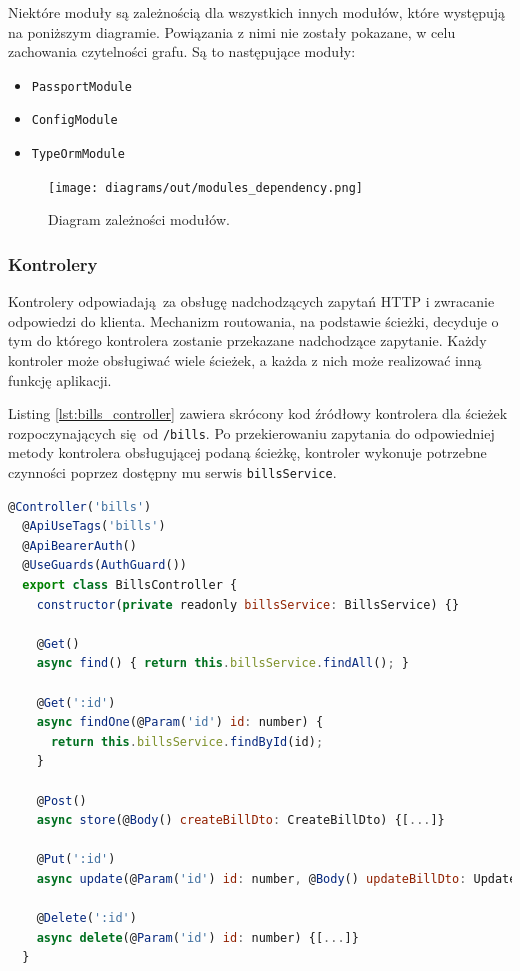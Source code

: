 Niektóre moduły są zależnością dla wszystkich innych modułów, które występują na poniższym diagramie. Powiązania z nimi nie zostały pokazane, w celu zachowania czytelności grafu. Są to następujące moduły:
\begin{itemize}[noitemsep]
  \item \lstinline{PassportModule}
  \item \lstinline{ConfigModule}
  \item \lstinline{TypeOrmModule}
\end{itemize}


\begin{figure}[H]
  \centering
  \texttt{[image: diagrams/out/modules\_dependency.png]}
  \caption{Diagram zależności modułów.}
\end{figure}


\subsubsection{Kontrolery}
Kontrolery odpowiadają za obsługę nadchodzących zapytań HTTP i zwracanie odpowiedzi do klienta. Mechanizm routowania, na podstawie ścieżki, decyduje o tym do którego kontrolera zostanie przekazane nadchodzące zapytanie. Każdy kontroler może obsługiwać wiele ścieżek, a każda z nich może realizować inną funkcję aplikacji. 

Listing \ref{lst:bills_controller} zawiera skrócony kod źródłowy kontrolera dla ścieżek rozpoczynających się od \mbox{\lstinline{/bills}.} Po przekierowaniu zapytania do odpowiedniej metody kontrolera obsługującej podaną ścieżkę, kontroler wykonuje potrzebne czynności poprzez dostępny mu serwis \lstinline{billsService}.

\begin{lstlisting}[language=JavaScript, caption={Implementacja kontrolera dla ścieżki \lstinline{bills}.}, label=lst:bills_controller]
  @Controller('bills')
  @ApiUseTags('bills')
  @ApiBearerAuth()
  @UseGuards(AuthGuard())
  export class BillsController {
    constructor(private readonly billsService: BillsService) {}

    @Get()
    async find() { return this.billsService.findAll(); }
  
    @Get(':id')
    async findOne(@Param('id') id: number) {
      return this.billsService.findById(id);
    }

    @Post()
    async store(@Body() createBillDto: CreateBillDto) {[...]}
  
    @Put(':id')
    async update(@Param('id') id: number, @Body() updateBillDto: UpdateBillDto) {[...]}
  
    @Delete(':id')
    async delete(@Param('id') id: number) {[...]}
  }
  \end{lstlisting}

